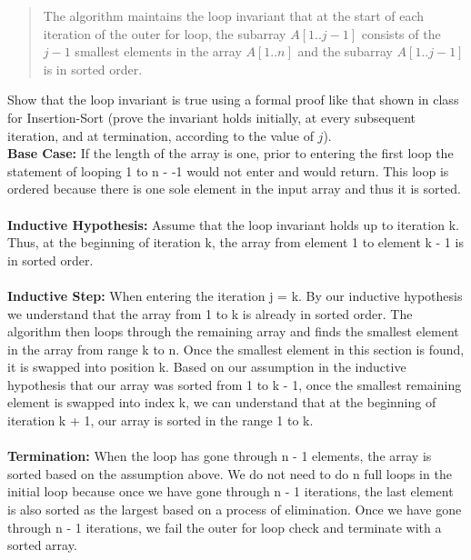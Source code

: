 \documentclass[10pt]{article}
\begin{document}
\begin{enumerate}
\begin{quote}
The algorithm maintains the loop invariant that at the start of each iteration of the outer for loop, the subarray $A[1..j-1]$ consists of the
$j-1$ smallest elements in the array $A[1..n]$ and the subarray $A[1..j-1]$ is in sorted order.
\end{quote}




Show that the loop invariant is true using a formal proof like that shown in class for {\sc Insertion-Sort} (prove the invariant holds initially, at every subsequent iteration, and at termination, according to the value of $j$).\\

\textbf{Base Case:} If the length of the array is one, prior to entering the first loop the statement of looping 1 to n - -1 would not enter and would return. This loop is ordered because there is one sole element in the input array and thus it is sorted.
\\
\\
\textbf{Inductive Hypothesis:} Assume that the loop invariant holds up to iteration k. Thus, at the beginning of iteration k, the array from element 1 to element k - 1 is in sorted order.
\\
\\
\textbf{Inductive Step:} When entering the iteration j = k. By our inductive hypothesis we understand that the array from 1 to k is already in sorted order. The algorithm then loops through the remaining array and finds the smallest element in the array from range k to n. Once the smallest element in this section is found, it is swapped into position k. Based on our assumption in the inductive hypothesis that our array was sorted from 1 to k - 1, once the smallest remaining element is swapped into index k, we can understand that at the beginning of iteration k + 1, our array is sorted in the range 1 to k. \\
\\
\textbf{Termination:} When the loop has gone through n - 1 elements, the array is sorted based on the assumption above. We do not need to do n full loops in the initial loop because once we have gone through n - 1 iterations, the last element is also sorted as the largest based on a process of elimination. Once we have gone through n - 1 iterations, we fail the outer for loop check and terminate with a sorted array.

\vspace{5in}


\end{enumerate}
\end{document}
